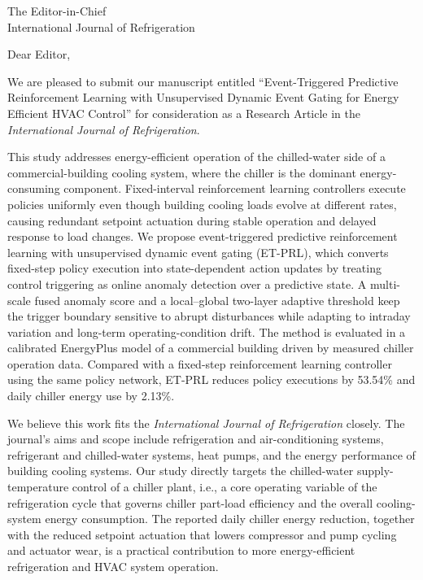 \documentclass[11pt]{letter}
\begin{document}
\begin{letter}{The Editor-in-Chief\\International Journal of Refrigeration}

\opening{Dear Editor,}

We are pleased to submit our manuscript entitled ``Event-Triggered Predictive Reinforcement Learning with Unsupervised Dynamic Event Gating for Energy Efficient HVAC Control'' for consideration as a Research Article in the \textit{International Journal of Refrigeration}.

This study addresses energy-efficient operation of the chilled-water side of a commercial-building cooling system, where the chiller is the dominant energy-consuming component. Fixed-interval reinforcement learning controllers execute policies uniformly even though building cooling loads evolve at different rates, causing redundant setpoint actuation during stable operation and delayed response to load changes. We propose event-triggered predictive reinforcement learning with unsupervised dynamic event gating (ET-PRL), which converts fixed-step policy execution into state-dependent action updates by treating control triggering as online anomaly detection over a predictive state. A multi-scale fused anomaly score and a local--global two-layer adaptive threshold keep the trigger boundary sensitive to abrupt disturbances while adapting to intraday variation and long-term operating-condition drift. The method is evaluated in a calibrated EnergyPlus model of a commercial building driven by measured chiller operation data. Compared with a fixed-step reinforcement learning controller using the same policy network, ET-PRL reduces policy executions by 53.54\% and daily chiller energy use by 2.13\%.

We believe this work fits the \textit{International Journal of Refrigeration} closely. The journal's aims and scope include refrigeration and air-conditioning systems, refrigerant and chilled-water systems, heat pumps, and the energy performance of building cooling systems. Our study directly targets the chilled-water supply-temperature control of a chiller plant, i.e., a core operating variable of the refrigeration cycle that governs chiller part-load efficiency and the overall cooling-system energy consumption. The reported daily chiller energy reduction, together with the reduced setpoint actuation that lowers compressor and pump cycling and actuator wear, is a practical contribution to more energy-efficient refrigeration and HVAC system operation.


\end{letter}
\end{document}

